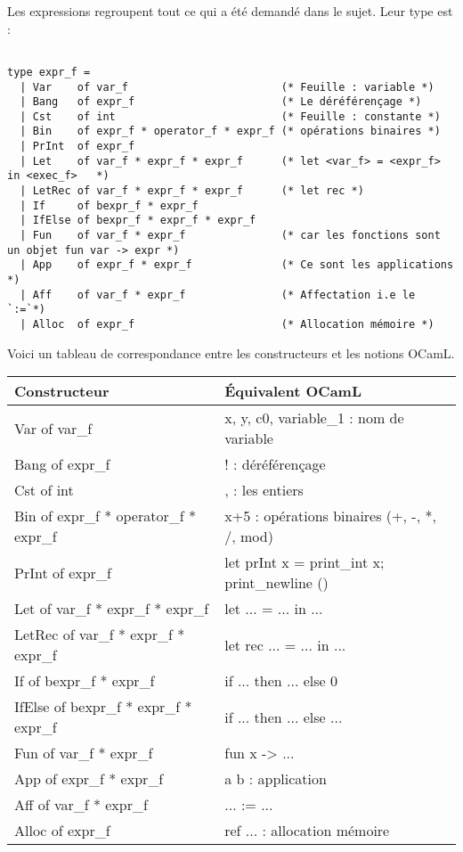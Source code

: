 \documentclass{article}
\newcommand\code[1]{{\fontfamily{lmtt}\selectfont #1}}
\begin{document}
	Les expressions regroupent tout ce qui a été demandé dans le sujet. Leur type est :
	
	\begin{verbatim}
	
type expr_f =
  | Var    of var_f                        (* Feuille : variable *)
  | Bang   of expr_f                       (* Le déréférençage *)
  | Cst    of int                          (* Feuille : constante *)
  | Bin    of expr_f * operator_f * expr_f (* opérations binaires *)
  | PrInt  of expr_f
  | Let    of var_f * expr_f * expr_f      (* let <var_f> = <expr_f> in <exec_f>   *)
  | LetRec of var_f * expr_f * expr_f      (* let rec *)
  | If     of bexpr_f * expr_f
  | IfElse of bexpr_f * expr_f * expr_f
  | Fun    of var_f * expr_f               (* car les fonctions sont un objet fun var -> expr *)
  | App    of expr_f * expr_f              (* Ce sont les applications *)
  | Aff    of var_f * expr_f               (* Affectation i.e le `:=`*)
  | Alloc  of expr_f                       (* Allocation mémoire *)

	\end{verbatim}
	
	\vspace{0.5cm}
	Voici un tableau de correspondance entre les constructeurs et les notions OCamL.
	
	\begin{center}
	\begin{tabular}{l | l}
		Constructeur & Équivalent OCamL \\
		\hline
		\code{Var of var\_f} & \code{x, y, c0, variable\_1} : nom de variable \\
  		\code{Bang of expr\_f} & \code{!} : déréférençage\\
		\code{Cst of int} & \code{0}, \code{1} : les entiers\\
		\code{Bin of expr\_f * operator\_f * expr\_f} & \code{x+5} : opérations binaires (\code{+, -, *, /, mod}) \\
  		\code{PrInt of expr\_f} & \code{let prInt x = print\_int x; print\_newline ()} \\
		\code{Let of var\_f * expr\_f * expr\_f} & \code{let ... = ... in ... } \\
		\code{LetRec of var\_f * expr\_f * expr\_f} & \code{let rec ... = ... in ... }\\
		\code{If of bexpr\_f * expr\_f} & \code{if ... then ... else 0} \\
		\code{IfElse of bexpr\_f * expr\_f * expr\_f} & \code{if ... then ... else ...} \\
		\code{Fun of var\_f * expr\_f} & \code{fun x -> ... } \\
		\code{App of expr\_f * expr\_f} & \code{ a b } : application \\
		\code{Aff of var\_f * expr\_f} & \code{... := ...} \\
  		\code{Alloc of expr\_f} & \code{ref ...} : allocation mémoire \\ 
	\end{tabular}
	\end{center}
	
\end{document}
